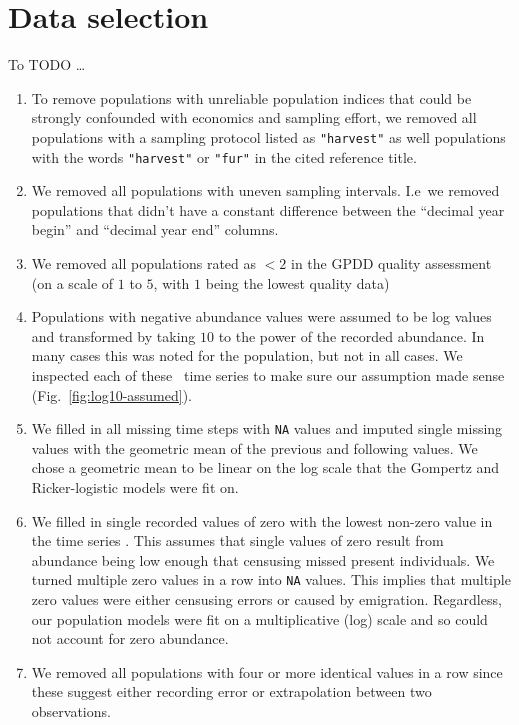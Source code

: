 \documentclass[12pt]{article}
\begin{document}
\section{Data selection}

To TODO \ldots

\begin{enumerate}

\item To remove populations with unreliable population indices that could be strongly confounded with economics and sampling effort, we removed all populations with a sampling protocol listed as \texttt{"harvest"} as well populations with the words \texttt{"harvest"} or \texttt{"fur"} in the cited reference title.
\item We removed all populations with uneven sampling intervals. I.e\ we removed populations that didn't have a constant difference between the ``decimal year begin'' and ``decimal year end'' columns.
\item We removed all populations rated as $< 2$ in the GPDD quality assessment (on a scale of $1$ to $5$, with $1$ being the lowest quality data) \citep[following][]{sibly2005, ziebarth2010}
\item Populations with negative abundance values were assumed to be log values and transformed by taking $10$ to the power of the recorded abundance. In many cases this was noted for the population, but not in all cases. We inspected each of these  \totalAssumedLog\ time series to make sure our assumption made sense (Fig.~\ref{fig:log10-assumed}).
\item We filled in all missing time steps with \texttt{NA} values and imputed single missing values with the geometric mean of the previous and following values. We chose a geometric mean to be linear on the log scale that the Gompertz and Ricker-logistic models were fit on.
\item We filled in single recorded values of zero with the lowest non-zero value in the time series \citep[following][]{brook2006a}. This assumes that single values of zero result from abundance being low enough that censusing missed present individuals. We turned multiple zero values in a row into \texttt{NA} values. This implies that multiple zero values were either censusing errors or caused by emigration. Regardless, our population  models were fit on a multiplicative (log) scale and so could not account for zero abundance.
\item We removed all populations with four or more identical values in a row since these suggest either recording error or extrapolation between two observations.

\end{enumerate}
\end{document}
